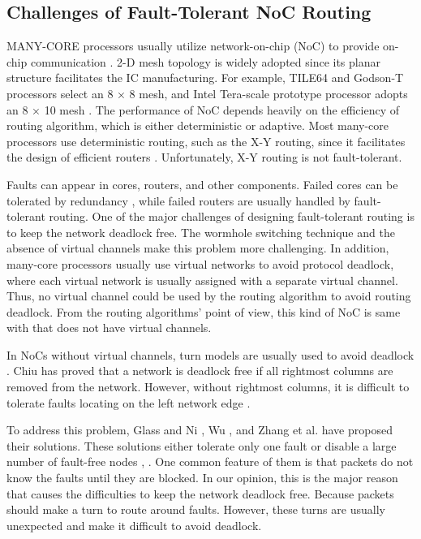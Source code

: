 \subsection{Challenges of Fault-Tolerant NoC Routing}
MANY-CORE processors usually utilize network-on-chip (NoC) to provide on-chip communication \cite{dally2004principles}. 2-D mesh topology is widely adopted since its planar structure facilitates the IC manufacturing. For example, TILE64 \cite{bell2008tile64} and Godson-T \cite{fan2009godson} processors select an 8 × 8 mesh, and Intel Tera-scale prototype processor adopts an 8 × 10 mesh \cite{vangal200880}. The performance of NoC depends heavily on the efficiency of routing algorithm, which is either deterministic or adaptive. Most many-core processors use deterministic routing, such as the X-Y routing, since it facilitates the design of efficient routers \cite{bell2008tile64} \cite{fan2009godson} \cite{vangal200880}. Unfortunately, X-Y routing is not fault-tolerant.

Faults can appear in cores, routers, and other components. Failed cores can be tolerated by redundancy \cite{zhang2009topology}, while failed routers are usually handled by fault-tolerant routing. One of the major challenges of designing fault-tolerant routing is to keep the network deadlock free. The wormhole switching technique and the absence of virtual channels make this problem more challenging. In addition, many-core processors usually use virtual networks to avoid protocol deadlock, where each virtual network is usually assigned with a separate virtual channel. Thus, no virtual channel could be used by the routing algorithm to avoid routing deadlock. From the routing algorithms’ point of view, this kind of NoC is same with that does not have virtual channels.

In NoCs without virtual channels, turn models are usually used to avoid deadlock \cite{glass1992turn} \cite{chiu2000odd} \cite{fu2011abacus}. Chiu \cite{chiu2000odd} has proved that a network is deadlock free if all rightmost columns are removed from the network. However, without rightmost columns, it is difficult to tolerate faults locating on the left network edge \cite{glass1993fault} \cite{wu2003fault} \cite{zhang2008reconfigurable}.

To address this problem, Glass and Ni \cite{glass1993fault}, Wu \cite{wu2003fault}, and Zhang et al. \cite{zhang2008reconfigurable} have proposed their solutions. These solutions either tolerate only one fault \cite{glass1993fault} or disable a large number of fault-free nodes \cite{wu2003fault}, \cite{zhang2008reconfigurable}. One common feature of them is that packets do not know the faults until they are blocked. In our opinion, this is the major reason that causes the difficulties to keep the network deadlock free. Because packets should make a turn to route around faults. However, these turns are usually unexpected and make it difficult to
avoid deadlock.

